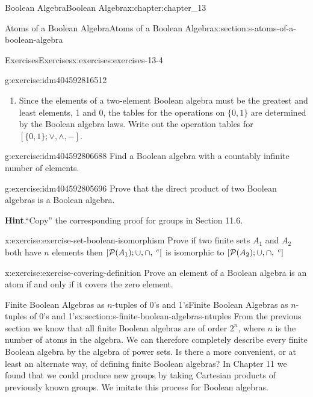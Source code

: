 \documentclass[twoside,10pt,]{book}
\newcommand{\blocktitlefont}{\relax}
\numberwithin{equation}{section}
\begin{document}
\begin{chapterptx}{Boolean Algebra}{}{Boolean Algebra}{}{}{x:chapter:chapter_13}
\begin{sectionptx}{Atoms of a Boolean Algebra}{}{Atoms of a Boolean Algebra}{}{}{x:section:s-atoms-of-a-boolean-algebra}
\begin{exercises-subsection}{Exercises}{}{Exercises}{}{}{x:exercises:exercises-13-4}
\begin{divisionexercise}{6}{}{}{g:exercise:idm404592816512}
\begin{enumerate}[label=(\alph*)]
\item{}Since the elements of a two-element Boolean algebra must be the greatest and least elements, 1 and 0, the tables for the operations on \(\{0, 1\}\) are determined by the Boolean algebra laws. Write out the operation tables for \([\{0, 1\}; \lor , \land, -]\).%
\end{enumerate}
%
\end{divisionexercise}%
\begin{divisionexercise}{7}{}{}{g:exercise:idm404592806688}%
Find a Boolean algebra with a countably infinite number of elements.%
\end{divisionexercise}%
\begin{divisionexercise}{8}{}{}{g:exercise:idm404592805696}%
Prove that the direct product of two Boolean algebras is a Boolean algebra.%
\par\smallskip%
\noindent\textbf{\blocktitlefont Hint}.\label{g:hint:idm404592797680}{}\hypertarget{g:hint:idm404592797680}{}\quad{}``Copy'' the corresponding proof for groups in Section 11.6.%
\end{divisionexercise}%
\begin{divisionexercise}{9}{}{}{x:exercise:exercise-set-boolean-isomorphism}%
Prove if two finite sets \(A_1\) and \(A_2\) both have \(n\) elements then \([\mathcal{P}(A_1);  \cup , \cap, \hspace{1 mm}^c]\) is isomorphic to \([\mathcal{P}(A_2);  \cup , \cap, \hspace{1 mm}^c]\)%
\end{divisionexercise}%
\begin{divisionexercise}{10}{}{}{x:exercise:exercise-covering-definition}%
Prove an element of a Boolean algebra is an atom if and only if it covers the zero element.%
\end{divisionexercise}%
\end{exercises-subsection}
\end{sectionptx}
%
%
\typeout{************************************************}
\typeout{************************************************}
%
\begin{sectionptx}{Finite Boolean Algebras as \(n\)-tuples of 0's and 1's}{}{Finite Boolean Algebras as \(n\)-tuples of 0's and 1's}{}{}{x:section:s-finite-boolean-algebras-ntuples}
From the previous section we know that all finite Boolean algebras are of order \(2^n\), where \(n\) is the number of atoms in the algebra. We can therefore completely describe every finite Boolean algebra by the algebra of power sets. Is there a more convenient, or at least an alternate way, of defining finite Boolean algebras? In Chapter 11 we found that we could produce new groups by taking Cartesian products of previously known groups. We imitate this process for Boolean algebras.%

\end{sectionptx}
\end{chapterptx}
\end{document}
